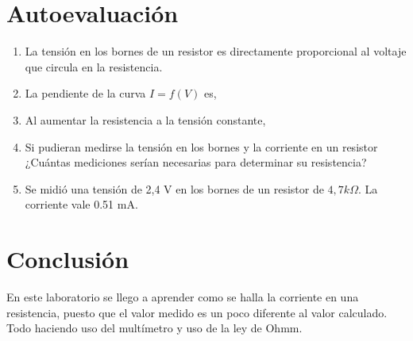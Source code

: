 \section{Autoevaluación}
\begin{enumerate}
	\item La tensión en los bornes de un resistor es directamente proporcional al voltaje que circula en la resistencia.
	\item La pendiente de la curva $I=f(V)$ es, 
	\item Al aumentar la resistencia a la tensión constante,
	\item Si pudieran medirse la tensión en los bornes y la corriente en un resistor ¿Cuántas mediciones serían necesarias para determinar su resistencia?
	\item Se midió una tensión de 2,4 V en los bornes de un resistor de $4,7 k \Omega$. La corriente vale 0.51 mA.
\end{enumerate}
\section{Conclusión}
En este laboratorio se llego a aprender como se halla la corriente en una resistencia, puesto que el valor medido es un poco diferente al valor calculado. Todo haciendo uso del multímetro y uso de la ley de Ohmm.